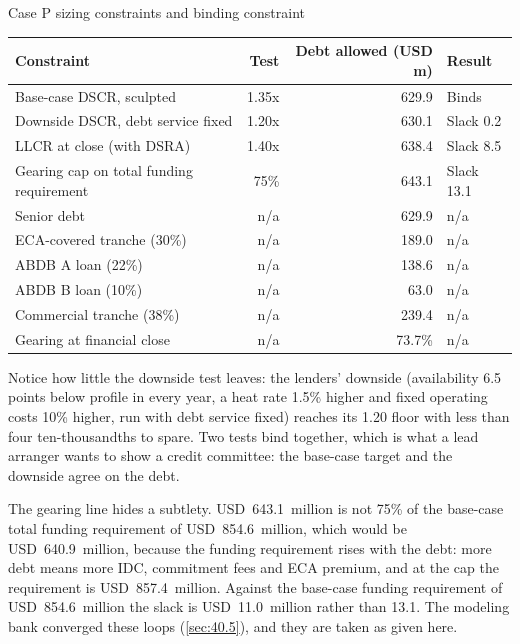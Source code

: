 \begin{exhibit}[H]
\caption{Case P sizing constraints and binding constraint \casep}\label{exh:36.12}
\small
\begin{tabularx}{\linewidth}{@{}L rrl@{}}
\toprule
Constraint & Test & Debt allowed (USD m) & Result\\
\midrule
Base-case DSCR, sculpted & 1.35x & 629.9 & Binds\\
Downside DSCR, debt service fixed & 1.20x & 630.1 & Slack 0.2\\
LLCR at close (with DSRA) & 1.40x & 638.4 & Slack 8.5\\
Gearing cap on total funding requirement & 75\% & 643.1 & Slack 13.1\\
\midrule
Senior debt & n/a & 629.9 & n/a\\
\quad ECA-covered tranche (30\%) & n/a & 189.0 & n/a\\
\quad ABDB A loan (22\%) & n/a & 138.6 & n/a\\
\quad ABDB B loan (10\%) & n/a & 63.0 & n/a\\
\quad Commercial tranche (38\%) & n/a & 239.4 & n/a\\
Gearing at financial close & n/a & 73.7\% & n/a\\
\bottomrule
\end{tabularx}
\end{exhibit}

Notice how little the downside test leaves: the lenders' downside (availability 6.5 points below profile in every year, a heat rate 1.5\% higher and fixed operating costs 10\% higher, run with debt service fixed) reaches its 1.20\x{} floor with less than four ten-thousandths to spare. Two tests bind together, which is what a lead arranger wants to show a credit committee: the base-case target and the downside agree on the debt.

The gearing line hides a subtlety. USD~643.1~million is not 75\% of the base-case total funding requirement of USD~854.6~million, which would be USD~640.9~million, because the funding requirement rises with the debt: more debt means more IDC, commitment fees and ECA premium, and at the cap the requirement is USD~857.4~million. Against the base-case funding requirement of USD~854.6~million the slack is USD~11.0~million rather than 13.1. The modeling bank converged these loops (\cref{sec:40.5}), and they are taken as given here.

